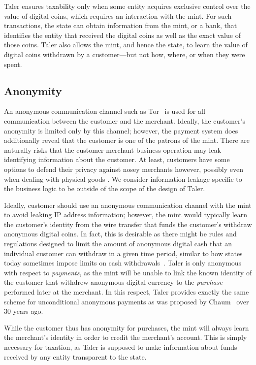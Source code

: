 \documentclass{llncs}
\begin{document}
Taler ensures taxability only when some entity acquires exclusive
control over the value of digital coins, which requires an interaction
with the mint.  For such transactions, the state can obtain information
from the mint, or a bank, that identifies the entity that received the
digital coins as well as the exact value of those coins.
Taler also allows the mint, and hence the state, to learn the value of
digital coins withdrawn by a customer---but not how, where, or when
they were spent.

\subsection{Anonymity}

An anonymous communication channel such as Tor~\cite{tor-design} is
used for all communication between the customer and the merchant.
Ideally, the customer's anonymity is limited only by this channel;
however, the payment system does additionally reveal that the customer
is one of the patrons of the mint.
There are naturally risks that the customer-merchant business operation
may leak identifying information about the customer.   At least, customers
have some options to defend their privacy against nosey merchants however,
possibly even when dealing with physical goods \cite{apod}.
We consider information leakage specific to the business logic to be
outside of the scope of the design of Taler.

Ideally, customer should use an anonymous communication channel with
the mint to avoid leaking IP address information; however, the mint
would typically learn the customer's identity from the wire transfer
that funds the customer's withdraw anonymous digital coins.
In fact, this is desirable as there might be rules and regulations
designed to limit the amount of anonymous digital cash that an
individual customer can withdraw in a given time period, similar to
how states today sometimes impose limits on cash
withdrawals~\cite{france2015cash,greece2015cash}.
Taler is only anonymous with respect to {\em payments}, as the mint
will be unable to link the known identity of the customer that withdrew
anonymous digital currency to the {\em purchase} performed later at the
merchant.  In this respect, Taler provides exactly the same scheme for
unconditional anonymous payments as was proposed by
Chaum~\cite{chaum1983blind,chaum1990untraceable} over 30 years ago.

While the customer thus has anonymity for purchases, the mint will
always learn the merchant's identity in order to credit the merchant's
account.  This is simply necessary for taxation, as Taler is supposed
to make information about funds received by any entity transparent
to the state.
\end{document}
